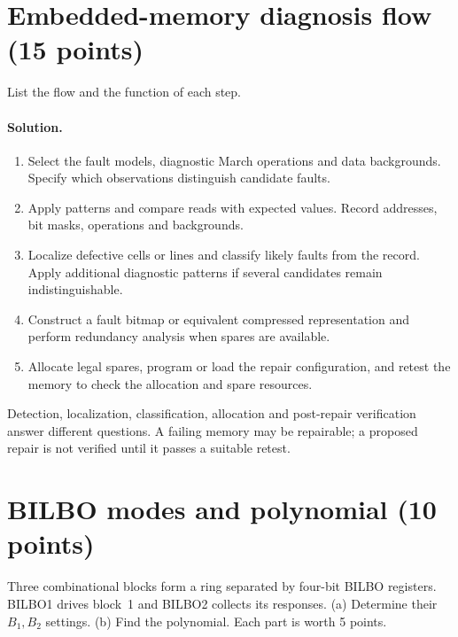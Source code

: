 \documentclass[11pt,a4paper]{article}
\newcommand{\sol}{\paragraph{Solution.}}
\begin{document}
\section{Embedded-memory diagnosis flow (15 points)}
List the flow and the function of each step.
\sol
\begin{enumerate}
\item Select the fault models, diagnostic March operations and data backgrounds. Specify which observations distinguish candidate faults.
\item Apply patterns and compare reads with expected values. Record addresses, bit masks, operations and backgrounds.
\item Localize defective cells or lines and classify likely faults from the record. Apply additional diagnostic patterns if several candidates remain indistinguishable.
\item Construct a fault bitmap or equivalent compressed representation and perform redundancy analysis when spares are available.
\item Allocate legal spares, program or load the repair configuration, and retest the memory to check the allocation and spare resources.
\end{enumerate}
Detection, localization, classification, allocation and post-repair verification answer different questions. A failing memory may be repairable; a proposed repair is not verified until it passes a suitable retest.

\section{BILBO modes and polynomial (10 points)}
Three combinational blocks form a ring separated by four-bit BILBO registers. BILBO1 drives block~1 and BILBO2 collects its responses. (a) Determine their $B_1,B_2$ settings. (b) Find the polynomial. Each part is worth 5 points.
\end{document}

